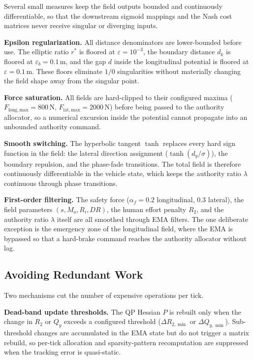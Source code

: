 \documentclass[12pt,a4paper,oneside]{report}
\begin{document}
Several small measures keep the field outputs bounded and continuously differentiable, so that the downstream sigmoid mappings and the Nash cost matrices never receive singular or diverging inputs.

\textbf{Epsilon regularization.} All distance denominators are lower-bounded before use. The elliptic ratio $r^{*}$ is floored at $\varepsilon = 10^{-3}$, the boundary distance $d_k$ is floored at $\varepsilon_b = 0.1\,\mathrm{m}$, and the gap $d$ inside the longitudinal potential is floored at $\varepsilon = 0.1\,\mathrm{m}$. These floors eliminate $1/0$ singularities without materially changing the field shape away from the singular point.

\textbf{Force saturation.} All fields are hard-clipped to their configured maxima ($F_{\mathrm{long,max}} = 800\,\mathrm{N}$, $F_{\mathrm{lat,max}} = 2000\,\mathrm{N}$) before being passed to the authority allocator, so a numerical excursion inside the potential cannot propagate into an unbounded authority command.

\textbf{Smooth switching.} The hyperbolic tangent $\tanh$ replaces every hard sign function in the field: the lateral direction assignment ($\tanh(d_y/\sigma)$), the boundary repulsion, and the phase-fade transitions. The total field is therefore continuously differentiable in the vehicle state, which keeps the authority ratio $\lambda$ continuous through phase transitions.

\textbf{First-order filtering.} The safety force ($\alpha_f = 0.2$ longitudinal, $0.3$ lateral), the field parameters $(s, M_o, R_i, DR)$, the human effort penalty $R_2$, and the authority ratio $\lambda$ itself are all smoothed through EMA filters. The one deliberate exception is the emergency zone of the longitudinal field, where the EMA is bypassed so that a hard-brake command reaches the authority allocator without lag.

\subsection{Avoiding Redundant Work}
\label{sec:chap3_avoidwork}

Two mechanisms cut the number of expensive operations per tick.

\textbf{Dead-band update thresholds.} The QP Hessian $P$ is rebuilt only when the change in $R_2$ or $Q_y$ exceeds a configured threshold ($\Delta R_{2,\min}$ or $\Delta Q_{y,\min}$). Sub-threshold changes are accumulated in the EMA state but do not trigger a matrix rebuild, so per-tick allocation and sparsity-pattern recomputation are suppressed when the tracking error is quasi-static.
\end{document}
